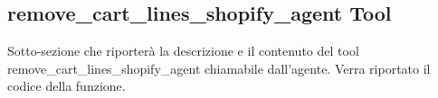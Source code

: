 \subsection{remove\_cart\_lines\_shopify\_agent Tool}

Sotto-sezione che riporterà la descrizione e il contenuto del tool remove\_cart\_lines\_shopify\_agent chiamabile dall'agente.
Verra riportato il codice della funzione.
